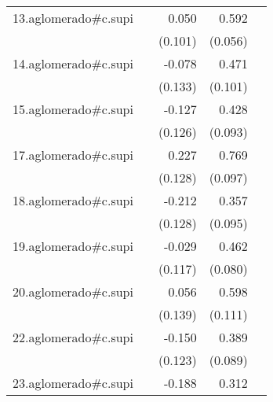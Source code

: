 {\begin{longtable}{l*{4}{D{.}{.}{-1}}}
\addlinespace
13.aglomerado#c.supi&                     &       0.050         &       0.592\sym{***}&                     \\
            &                     &     (0.101)         &     (0.056)         &                     \\
\addlinespace
14.aglomerado#c.supi&                     &      -0.078         &       0.471\sym{***}&                     \\
            &                     &     (0.133)         &     (0.101)         &                     \\
\addlinespace
15.aglomerado#c.supi&                     &      -0.127         &       0.428\sym{***}&                     \\
            &                     &     (0.126)         &     (0.093)         &                     \\
\addlinespace
17.aglomerado#c.supi&                     &       0.227         &       0.769\sym{***}&                     \\
            &                     &     (0.128)         &     (0.097)         &                     \\
\addlinespace
18.aglomerado#c.supi&                     &      -0.212         &       0.357\sym{***}&                     \\
            &                     &     (0.128)         &     (0.095)         &                     \\
\addlinespace
19.aglomerado#c.supi&                     &      -0.029         &       0.462\sym{***}&                     \\
            &                     &     (0.117)         &     (0.080)         &                     \\
\addlinespace
20.aglomerado#c.supi&                     &       0.056         &       0.598\sym{***}&                     \\
            &                     &     (0.139)         &     (0.111)         &                     \\
\addlinespace
22.aglomerado#c.supi&                     &      -0.150         &       0.389\sym{***}&                     \\
            &                     &     (0.123)         &     (0.089)         &                     \\
\addlinespace
23.aglomerado#c.supi&                     &      -0.188         &       0.312\sym{***}&                     \\

\end{longtable}}
